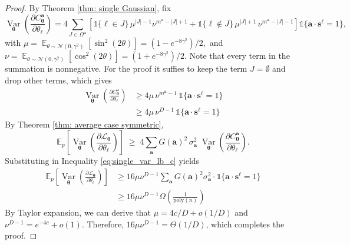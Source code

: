 \documentclass[a4paper,onecolumn,notitlepage,nofootinbib,longbibliography,superscriptaddress, floatfix, pra, aps, 10pt]{revtex4-2}
\newcommand{\vttheta}{{\bm{\theta}}}
\newcommand{\vta}{{\bm{a}}}
\newcommand{\vtsl}{{\bm{s}^\ell}}
\begin{document}
\begin{proof}
By Theorem \ref{thm: single Gaussian}, fix 
\begin{equation}
\operatorname*{Var}_{\vttheta}\!\left(\frac{\partial C_\vttheta^\vta}{\partial\theta_\ell}\right)
=
4\sum_{J\in \Omega^\vta}
\left[
\mathds{1}\{\ell\in J\}\,\mu^{|J|-1}\nu^{m^\vta-|J|+1}
+
\mathds{1}\{\ell\notin J\}\,\mu^{|J|+1}\,\nu^{m^\vta-|J|-1}
\right] \mathds{1}\{\vta \cdot \vtsl=1\},
\label{eq:single_var_exact_c}
\end{equation}
with $\mu=\operatorname*{\mathbb{E}}_{\theta\sim\mathcal N(0,\gamma^2)}[\sin^2(2\theta)] =(1-e^{-8\gamma^2})/2,$ and $
\nu=\operatorname*{\mathbb{E}}_{\theta\sim\mathcal N(0,\gamma^2)}[\cos^2(2\theta)]
=(1+e^{-8\gamma^2})/2$. Note that every term in the summation is nonnegative. For the proof it suffies to keep the term $J= \emptyset$ and drop other terms, which gives
\begin{align}
\operatorname*{Var}_{\vttheta}\!\left(\frac{\partial C_\vttheta^\vta}{\partial\theta_\ell}\right) & \geq 
4\mu\,\nu^{m^\vta-1}\,\mathds{1}\{\vta \cdot\vtsl=1\} \\
& \geq  4\mu\,\nu^{D-1}\,\mathds{1}\{\vta \cdot\vtsl=1\}  
\label{eq:single_var_lb_c}
\end{align}
By Theorem \ref{thm: average case symmetric},
\begin{equation}
\mathbb{E}_p\!\left[\operatorname*{Var}_{\vttheta}\!\left(\frac{\partial \mathcal{L}_\vttheta}{\partial\theta_\ell}\right)\right]
\;\ge\;
4\sum_{\vta} G(\vta)^2\,\sigma_\vta^2\;
\operatorname*{Var}_{\vttheta}\!\left(\frac{\partial C_\vttheta^\vta}{\partial\theta_\ell}\right). 
\label{eq:avgcase_lb_start_c}
\end{equation}
Substituting in Inequality \ref{eq:single_var_lb_c} yields \begin{align}
\mathbb{E}_p\left[\operatorname*{Var}_{\vttheta}\left(\frac{\partial \mathcal{L}_\vttheta}{\partial\theta_\ell}\right)\right]
& \geq
16\mu \nu^{D-1} \sum_{\vta} G(\vta)^2\sigma_\vta^2 \cdot  \mathds{1}\{\vta \cdot\vtsl=1\}  \\
&\geq 16\mu \nu^{D-1} \Omega(\frac{1}{\text{poly}(n)})
\end{align}
By Taylor expansion, we can derive that $\mu = 4c/D + o(1/D)$ and $\nu^{D-1} = e^{-4c} + o(1)$. Therefore, $16\mu \nu^{D-1} =\Theta(1/D)$, which completes the proof.

\end{proof}
\end{document}
